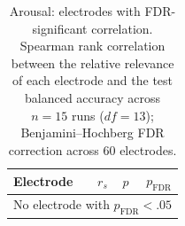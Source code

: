 \begin{table}[ht]
\centering
\small
\setlength{\tabcolsep}{4pt}
\caption{Arousal: electrodes with FDR-significant correlation. Spearman rank correlation between the relative relevance of each electrode and the test balanced accuracy across $n = 15$ runs ($\mathit{df} = 13$); Benjamini--Hochberg FDR correction across 60 electrodes.}
\label{tab:arousal_spearman_bacc}
\begin{tabular}{lrrr}
\toprule
Electrode & $r_s$ & $p$ & $p_{\mathrm{FDR}}$ \\
\midrule
\multicolumn{4}{l}{No electrode with $p_{\mathrm{FDR}} < .05$} \\
\bottomrule
\end{tabular}
\end{table}
